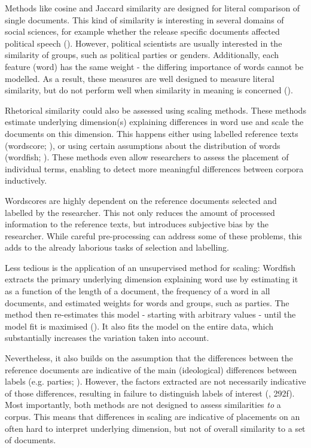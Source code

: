 \documentclass{article}
\begin{document}
Methods like cosine and Jaccard similarity are designed for literal comparison of single documents. This kind of similarity is interesting in several domains of social sciences, for example whether the release specific documents affected political speech (\cite{Hager2020, Similarity2007a}). However, political scientists are usually interested in the similarity of groups, such as political parties or genders. Additionally, each feature (word) has the same weight - the differing importance of words cannot be modelled. As a result, these measures are well designed to measure literal similarity, but do not perform well when similarity in meaning is concerned (\cite{Prasetya2018}).\par

Rhetorical similarity could also be assessed using scaling methods. These methods estimate underlying dimension(s) explaining differences in word use and scale the documents on this dimension. This happens either using labelled reference texts (wordscore; \cite{Laver2003}), or using certain assumptions about the distribution of words (wordfish; \cite{Slapin2008}). These methods even allow researchers to assess the placement of individual terms, enabling to detect more meaningful differences between corpora inductively. \par

Wordscores are highly dependent on the reference documents selected and labelled by the researcher. This not only reduces the amount of processed information to the reference texts, but introduces subjective bias by the researcher. While careful pre-processing can address some of these problems, this adds to the already laborious tasks of selection and labelling.\par

Less tedious is the application of an unsupervised method for scaling: Wordfish extracts the primary underlying dimension explaining word use by estimating it as a function of the length of a document, the frequency of a word in all documents, and estimated weights for words and groups, such as parties. The method then re-estimates this model - starting with arbitrary values - until the model fit is maximised (\cite{Slapin2008}). It also fits the model on the entire data, which substantially increases the variation taken into account.\par

Nevertheless, it also builds on the assumption that the differences between the reference documents are indicative of the main (ideological) differences between labels (e.g. parties; \cite{Lowe2008}). However, the factors extracted are not necessarily indicative of those differences, resulting in failure to distinguish labels of interest (\cite{Grimmer2013TextASData}, 292f). Most importantly, both methods are not designed to assess similarities \textit{to} a corpus. This means that differences in scaling are indicative of placements on an often hard to interpret underlying dimension, but not of overall similarity to a set of documents.\par
\end{document}
